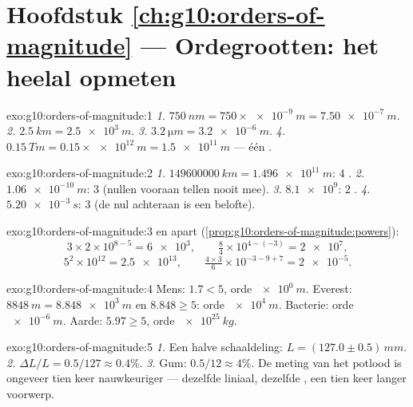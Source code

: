 \section*{Hoofdstuk \ref{ch:g10:orders-of-magnitude} --- Ordegrootten: het heelal opmeten}

\begin{solution}{exo:g10:orders-of-magnitude:1}
\emph{1.} $\qty{750}{nm} = 750 \times \qty{e-9}{m} = \qty{7.50e-7}{m}$.
\emph{2.} $\qty{2.5}{km} = \qty{2.5e3}{m}$.
\emph{3.} $\qty{3.2}{\micro m} = \qty{3.2e-6}{m}$.
\emph{4.} $\qty{0.15}{Tm} = 0.15 \times \qty{e12}{m} = \qty{1.5e11}{m}$
--- één .
\end{solution}

\begin{solution}{exo:g10:orders-of-magnitude:2}
\emph{1.} $\qty{149600000}{km} = \qty{1.496e11}{m}$: $4$ .
\emph{2.} $\qty{1.06e-10}{m}$: $3$  (nullen vooraan
tellen nooit mee).
\emph{3.} $\num{8.1e9}$: $2$ .
\emph{4.} $\qty{5.20e-3}{s}$: $3$  (de nul achteraan
is een belofte).
\end{solution}

\begin{solution}{exo:g10:orders-of-magnitude:3}
 en  apart
(\cref{prop:g10:orders-of-magnitude:powers}):
\[
3 \times 2 \times 10^{8-5} = \num{6e3}, \qquad
\tfrac{8}{4} \times 10^{4-(-3)} = \num{2e7},
\]
\[
5^{2} \times 10^{12} = \num{2.5e13}, \qquad
\tfrac{4 \times 3}{6} \times 10^{-3-9+7} = \num{2e-5} .
\]
\end{solution}

\begin{solution}{exo:g10:orders-of-magnitude:4}
Mens: $1.7 < 5$, orde $\qty{e0}{m}$. Everest:
$\qty{8848}{m} = \qty{8.848e3}{m}$ en $8.848 \geq 5$: orde
$\qty{e4}{m}$. Bacterie: orde $\qty{e-6}{m}$. Aarde: $5.97 \geq 5$,
orde $\qty{e25}{kg}$.
\end{solution}

\begin{solution}{exo:g10:orders-of-magnitude:5}
\emph{1.} Een halve schaaldeling: $L = (127.0 \pm 0.5)\,\unit{mm}$.
\emph{2.} $\Delta L / L = 0.5/127 \approx 0.4\%$.
\emph{3.} Gum: $0.5/12 \approx 4\%$. De meting van het potlood is
ongeveer tien keer nauwkeuriger --- dezelfde liniaal, dezelfde
, een tien keer langer voorwerp.
\end{solution}


